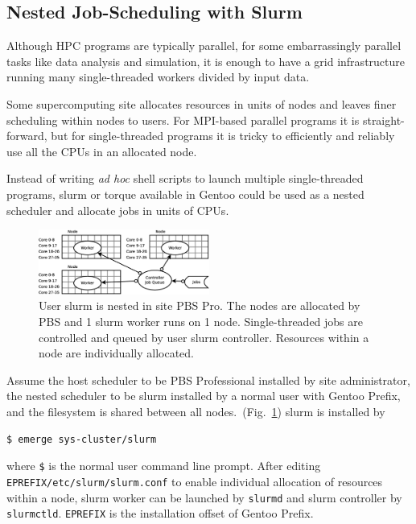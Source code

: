 \documentclass[a4paper,conference]{IEEEtran}
\begin{document}
\subsection{Nested Job-Scheduling with Slurm}
\label{sec:slurm}
Although HPC programs are typically parallel, for some embarrassingly
parallel tasks like data analysis and simulation, it is enough to have
a grid infrastructure running many single-threaded workers divided by
input data.

Some supercomputing site allocates resources in units of nodes and
leaves finer scheduling within nodes to users.  For MPI-based parallel
programs it is straight-forward, but for single-threaded programs it
is tricky to efficiently and reliably use all the CPUs in an allocated
node.

Instead of writing \textit{ad hoc} shell scripts to launch multiple
single-threaded programs, slurm or torque available in Gentoo could be
used as a nested scheduler and allocate jobs in units of
CPUs.

\begin{figure}[htb]
  \centering
  \includegraphics[width=0.5\textwidth]{node-slurm.eps}
  \caption{User slurm is nested in site PBS Pro.  The nodes are
    allocated by PBS and 1 slurm worker runs on 1 node.
    Single-threaded jobs are controlled and queued by user slurm
    controller.  Resources within a node are individually allocated.}
  \label{fig:slurm}
\end{figure}

Assume the host scheduler to be PBS Professional installed by site
administrator, the nested scheduler to be slurm installed by a normal
user with Gentoo Prefix, and the filesystem is shared between all
nodes.~(Fig.~\ref{fig:slurm}) slurm is installed by
\begin{verbatim}
$ emerge sys-cluster/slurm
\end{verbatim}
where \texttt{\$} is the normal user command line prompt.  After editing
\texttt{EPREFIX/etc/slurm/slurm.conf} to enable individual
allocation of resources within a node, slurm worker
can be launched by \texttt{slurmd} and slurm controller by
\texttt{slurmctld}.  \texttt{EPREFIX} is the installation offset of
Gentoo Prefix.
\end{document}
